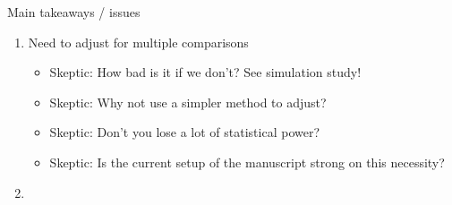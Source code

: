 \documentclass[11pt,a4paper]{article}
\theoremstyle{definition} %
\theoremstyle{case}
\begin{document}
Main takeaways / issues
\begin{enumerate}
    \item Need to adjust for multiple comparisons
    \begin{itemize}
        \item Skeptic: How bad is it if we don't? See simulation study!
        \item Skeptic: Why not use a simpler method to adjust?
        \item Skeptic: Don't you lose a lot of statistical power?
        \item Skeptic: Is the current setup of the manuscript strong on this necessity?
    \end{itemize}
    \item 
\end{enumerate}
\fi



\iffalse
\end{document}
